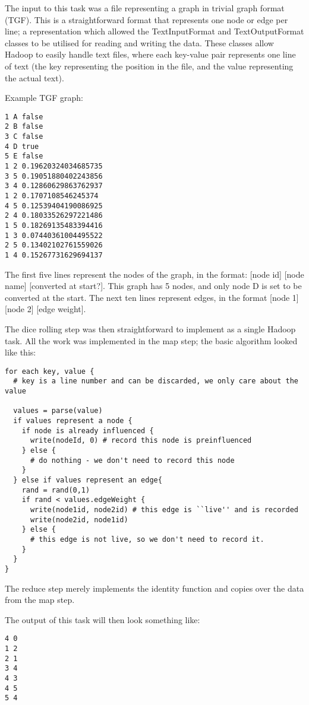The input to this task was a file representing a graph in trivial graph format (TGF). This is a straightforward format that represents one node or edge per line; a representation which allowed the TextInputFormat and TextOutputFormat classes to be utilised for reading and writing the data. These classes allow Hadoop to easily handle text files, where each key-value pair represents one line of text (the key representing the position in the file, and the value representing the actual text).

Example TGF graph:

\begin{verbatim}
1 A false
2 B false
3 C false
4 D true
5 E false
1 2 0.19620324034685735
3 5 0.19051880402243856
3 4 0.12860629863762937
1 2 0.1707108546245374
4 5 0.12539404190086925
2 4 0.18033526297221486
1 5 0.18269135483394416
1 3 0.07440361004495522
2 5 0.13402102761559026
1 4 0.15267731629694137
\end{verbatim}

The first five lines represent the nodes of the graph, in the format: [node id] [node name] [converted at start?]. This graph has 5 nodes, and only node D is set to be converted at the start. The next ten lines represent edges, in the format [node 1] [node 2] [edge weight].

The dice rolling step was then straightforward to implement as a single Hadoop task. All the work was implemented in the map step; the basic algorithm looked like this:

\begin{verbatim}
for each key, value {
  # key is a line number and can be discarded, we only care about the value

  values = parse(value)
  if values represent a node {
    if node is already influenced {
      write(nodeId, 0) # record this node is preinfluenced
    } else {
      # do nothing - we don't need to record this node
    }
  } else if values represent an edge{
    rand = rand(0,1)
    if rand < values.edgeWeight {
      write(node1id, node2id) # this edge is ``live'' and is recorded
      write(node2id, node1id)
    } else {
      # this edge is not live, so we don't need to record it.
    }
  }
}
\end{verbatim}

The reduce step merely implements the identity function and copies over the data from the map step.

The output of this task will then look something like:

\begin{verbatim}
4 0
1 2
2 1
3 4
4 3
4 5
5 4
\end{verbatim}

